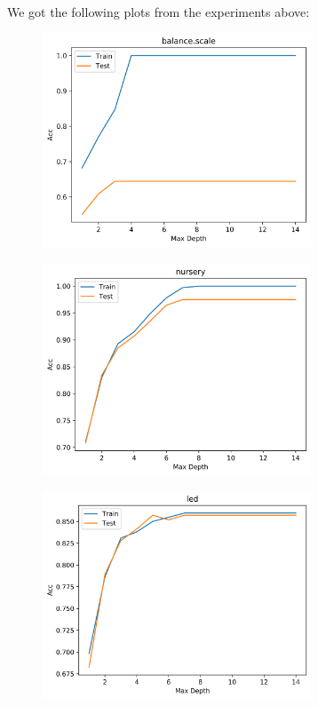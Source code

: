 \documentclass[11pt]{article}
\begin{document}
    \paragraph{}
    We got the following plots from the experiments above:
    \begin{figure}[H]
  		\begin{center}
  			\includegraphics[width=8cm]{code/pics/balance_scale_DecisionTree}
  		\end{center}
	\end{figure}
	\begin{figure}[H]
  		\begin{center}
  			\includegraphics[width=8cm]{code/pics/nursery_DecisionTree}
  		\end{center}
	\end{figure}
	\begin{figure}[H]
  		\begin{center}
  			\includegraphics[width=8cm]{code/pics/led_DecisionTree}
  		\end{center}
	\end{figure}
\end{document}
